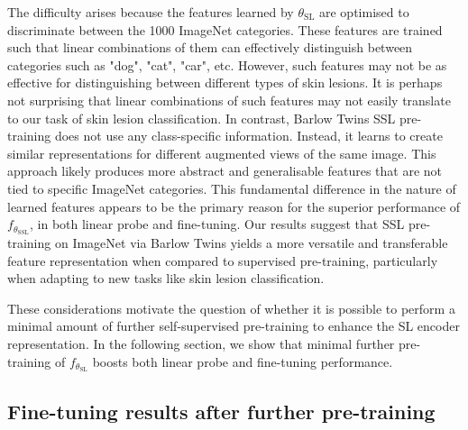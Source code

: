 \documentclass[a4paper,fleqn]{cas-dc}
\begin{document}
The difficulty arises because the features learned by $\theta_{\scriptscriptstyle\text{SL}}$ are optimised to discriminate between the 1000 ImageNet categories. These features are trained such that linear combinations of them can effectively distinguish between categories such as  "dog", "cat", "car", etc. However, such features may not be as effective for distinguishing between different types of skin lesions. It is perhaps not surprising that linear combinations of such features may not easily translate to our  task of skin lesion classification. In contrast, Barlow Twins SSL pre-training does not use any class-specific information. Instead, it learns to create similar representations for different augmented views of the same image. This approach likely produces more abstract and generalisable features that are not tied to specific ImageNet categories. This fundamental difference in the nature of learned  features appears to be the primary reason for the superior performance of $f_{\theta_{\scriptscriptstyle\text{SSL}}}$, in both linear probe and fine-tuning. Our results suggest that SSL pre-training on ImageNet via Barlow Twins yields a more versatile and transferable feature representation when compared to supervised pre-training, particularly when adapting to new tasks like skin lesion classification.

These considerations motivate the question of whether it is possible to perform a minimal amount of further self-supervised pre-training to enhance the SL encoder representation. In the following section, we show that minimal further pre-training of $f_{\theta_{\scriptscriptstyle\text{SL}}}$ boosts both linear probe and fine-tuning performance.%

\subsection{Fine-tuning results after further pre-training}
\end{document}
